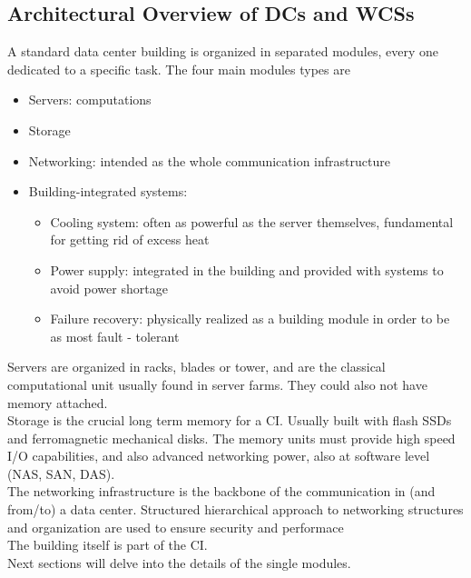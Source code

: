 \documentclass{article}
\begin{document}
			\subsection{Architectural Overview of DCs and WCSs}
				A standard data center building is organized in separated modules, every one dedicated to a specific task. The four main modules types are
				\begin{itemize}
					\item Servers: computations
					\item Storage
					\item Networking: intended as the whole communication infrastructure
					\item Building-integrated systems:
						\begin{itemize}
							\item Cooling system: often as powerful as the server themselves, fundamental for getting rid of excess heat
							\item Power supply: integrated in the building and provided with systems to avoid power shortage
							\item Failure recovery: physically realized as a building module in order to be as most fault - tolerant
						\end{itemize}
				\end{itemize}
				Servers are organized in racks, blades or tower, and are the classical computational unit usually found in server farms. They could also not have memory attached.\\
				Storage is the crucial long term memory for a CI. Usually built with flash SSDs and ferromagnetic mechanical disks. The memory units must provide high speed I/O capabilities, and also advanced networking power, also at software level (NAS, SAN, DAS).\\
				The networking infrastructure is the backbone of the communication in (and from/to) a data center. Structured hierarchical approach to networking structures and organization are used to ensure security and performace\\
				The building itself is part of the CI.\\
				Next sections will delve into the details of the single modules.
			
\end{document}

